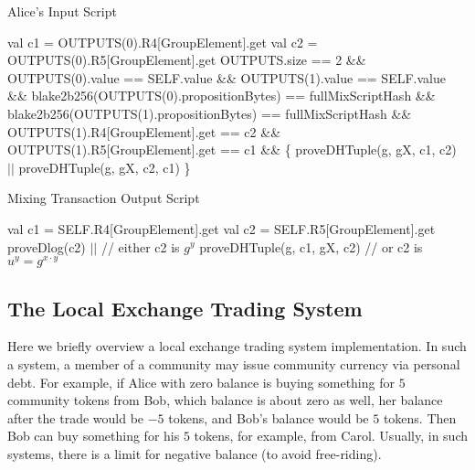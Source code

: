  \begin{algorithm}[H]
    \caption{Alice's Input Script}
    \label{alg:alice}
    \begin{algorithmic}[1]
        \State val c1 = OUTPUTS(0).R4[GroupElement].get
        \State val c2 = OUTPUTS(0).R5[GroupElement].get
        \State
        \State OUTPUTS.size == 2 \&\&
        \State OUTPUTS(0).value == SELF.value \&\&
        \State OUTPUTS(1).value == SELF.value \&\&
        \State blake2b256(OUTPUTS(0).propositionBytes) == fullMixScriptHash \&\&
        \State blake2b256(OUTPUTS(1).propositionBytes) == fullMixScriptHash \&\&
        \State OUTPUTS(1).R4[GroupElement].get == c2 \&\&
        \State OUTPUTS(1).R5[GroupElement].get == c1 \&\& \{
        \State\hspace{\algorithmicindent}  proveDHTuple(g, gX, c1, c2) $||$
        \State\hspace{\algorithmicindent}  proveDHTuple(g, gX, c2, c1)
        \State \}
    \end{algorithmic}
 \end{algorithm}

 \begin{algorithm}[H]
    \caption{Mixing Transaction Output Script}
    \label{alg:mixing-out}
    \begin{algorithmic}[1]
        \State val c1 = SELF.R4[GroupElement].get
        \State val c2 = SELF.R5[GroupElement].get
        \State proveDlog(c2) $||$            // either c2 is $g^y$
        \State proveDHTuple(g, c1, gX, c2) // or c2 is $u^y = g^{x \cdot y}$
    \end{algorithmic}
 \end{algorithm}


\subsection{The Local Exchange Trading System}
 \label{sec:platform}


 Here we briefly overview a local exchange trading system implementation. In such a system, a member of a community may
 issue community currency via personal debt. For example, if Alice with zero balance is buying something for $5$
 community tokens from Bob, which balance is about zero as well, her balance after the trade would be $-5$ tokens, and
 Bob's balance would be $5$ tokens. Then Bob can buy something for his $5$ tokens, for example, from Carol.
 Usually, in such systems, there is a limit for negative balance (to avoid free-riding).


